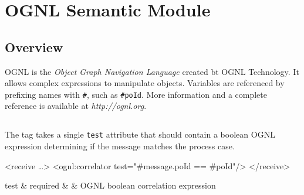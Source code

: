 \chapter{OGNL Semantic Module}

\section{Overview}

OGNL is the \emph{Object Graph Navigation Language}
created bt OGNL Technology.  It allows complex expressions to
manipulate objects.  Variables are referenced by prefixing
names with \verb|#|, such as \verb|#poId|.  More information
and a complete reference is available at \emph{http://ognl.org}.

\section{}

The  tag takes a single \verb|test| attribute
that should contain a boolean OGNL expression determining if
the message matches the process case.

\begin{codelisting}
<receive \dots>
    <ognl:correlator test="#message.poId == #poId"/>
</receive>
\end{codelisting}

\begin{attrDefs}
test		&	required	&			& OGNL boolean correlation expression \\
\end{attrDefs}
